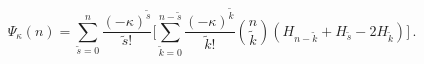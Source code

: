 \begin{equation}
\Psi_\kappa(n) = \sum_{\tilde s=0}^n 
\frac{(-\kappa)^{\tilde s}}{\tilde s!} \biggl[
\sum_{\tilde k=0}^{n-\tilde s} 
\frac{(-\kappa)^{\tilde k}}{\tilde k!} \binom{n}{\tilde k}
(H_{n-\tilde k}+H_{\tilde s}-2 H_{\tilde k}) \biggr]\,.
\end{equation}


